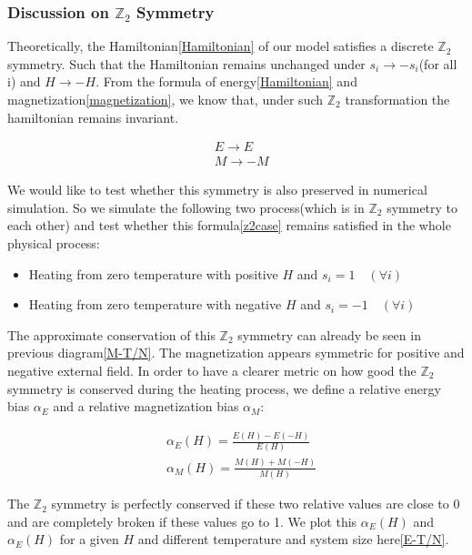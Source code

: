 \documentclass[11pt]{article}
\begin{document}
\subsubsection{Discussion on $\mathbb{Z}_2$ Symmetry}\label{Z2}

Theoretically, the Hamiltonian\ref{Hamiltonian} of our model satisfies a discrete $\mathbb{Z}_2$ symmetry. Such that the Hamiltonian remains unchanged under $s_i \rightarrow -s_i$(for all i) and $H \rightarrow -H$. From the formula of energy\ref{Hamiltonian} and magnetization\ref{magnetization}, we know that, under such $\mathbb{Z}_2$ transformation the hamiltonian remains invariant.

\begin{align}\label{z2case}
    &E \rightarrow E\\
    &M \rightarrow -M
\end{align}

We would like to test whether this symmetry is also preserved in numerical simulation. So we simulate the following two process(which is in $\mathbb{Z}_2$ symmetry to each other) and test whether this formula\ref{z2case} remains satisfied in the whole physical process:
\begin{itemize}
    \item Heating from zero temperature with positive $H$ and $s_i = 1 \quad(\forall i)$
    \item Heating from zero temperature with negative $H$ and $s_i = -1 \quad(\forall i)$
\end{itemize}

The approximate conservation of this $\mathbb{Z}_2$ symmetry can already be seen in previous diagram\ref{M-T/N}. The magnetization appears symmetric for positive and negative external field. In order to have a clearer metric on how good the $\mathbb{Z}_2$ symmetry is conserved during the heating process, we define a relative energy bias $\alpha_E$ and a relative magnetization bias $\alpha_M$:

\begin{align}
    &\alpha_E(H) = \frac{E(H)-E(-H)}{E(H)}\\
    &\alpha_M(H) = \frac{M(H)+M(-H)}{M(H)}
\end{align}

The $\mathbb{Z}_2$ symmetry is perfectly conserved if these two relative values are close to 0 and are completely broken if these values go to 1. We plot this $\alpha_E(H)$ and $\alpha_E(H)$ for a given $H$ and different temperature and system size here\ref{E-T/N}.
\end{document}
